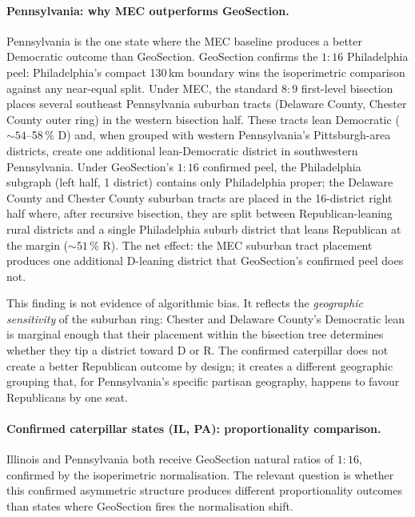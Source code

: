 \paragraph{Pennsylvania: why MEC outperforms GeoSection.}
Pennsylvania is the one state where the MEC baseline produces a better Democratic
outcome than GeoSection.
GeoSection confirms the $1:16$ Philadelphia peel: Philadelphia's compact
130\,km boundary wins the isoperimetric comparison against any near-equal split.
Under MEC, the standard $8:9$ first-level bisection places several southeast
Pennsylvania suburban tracts (Delaware County, Chester County outer ring) in
the western bisection half.
These tracts lean Democratic ($\sim 54$--58\,\% D) and, when grouped with
western Pennsylvania's Pittsburgh-area districts, create one additional
lean-Democratic district in southwestern Pennsylvania.
Under GeoSection's $1:16$ confirmed peel, the Philadelphia subgraph (left half,
1 district) contains only Philadelphia proper; the Delaware County and Chester
County suburban tracts are placed in the 16-district right half where, after
recursive bisection, they are split between Republican-leaning rural districts
and a single Philadelphia suburb district that leans Republican at the margin
($\sim 51$\,\% R).
The net effect: the MEC suburban tract placement produces one additional
D-leaning district that GeoSection's confirmed peel does not.

This finding is not evidence of algorithmic bias.
It reflects the \emph{geographic sensitivity} of the suburban ring:
Chester and Delaware County's Democratic lean is marginal enough that
their placement within the bisection tree determines whether they tip
a district toward D or R.
The confirmed caterpillar does not create a better Republican outcome by design;
it creates a different geographic grouping that, for Pennsylvania's specific
partisan geography, happens to favour Republicans by one seat.

\paragraph{Confirmed caterpillar states (IL, PA): proportionality comparison.}
Illinois and Pennsylvania both receive GeoSection natural ratios of $1:16$,
confirmed by the isoperimetric normalisation.
The relevant question is whether this confirmed asymmetric structure produces
different proportionality outcomes than states where GeoSection fires the
normalisation shift.

